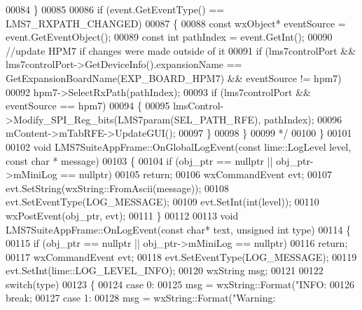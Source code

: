 \begin{DoxyCode}
00084 \textcolor{comment}{    \}}
00085 \textcolor{comment}{}
00086 \textcolor{comment}{    if (event.GetEventType() == LMS7\_RXPATH\_CHANGED)}
00087 \textcolor{comment}{    \{}
00088 \textcolor{comment}{        const wxObject* eventSource = event.GetEventObject();}
00089 \textcolor{comment}{        const int pathIndex = event.GetInt();}
00090 \textcolor{comment}{        //update HPM7 if changes were made outside of it}
00091 \textcolor{comment}{        if (lms7controlPort && lms7controlPort->GetDeviceInfo().expansionName ==
       GetExpansionBoardName(EXP\_BOARD\_HPM7) && eventSource != hpm7)}
00092 \textcolor{comment}{            hpm7->SelectRxPath(pathIndex);}
00093 \textcolor{comment}{        if (lms7controlPort && eventSource == hpm7)}
00094 \textcolor{comment}{        \{}
00095 \textcolor{comment}{            lmsControl->Modify\_SPI\_Reg\_bits(LMS7param(SEL\_PATH\_RFE), pathIndex);}
00096 \textcolor{comment}{            mContent->mTabRFE->UpdateGUI();}
00097 \textcolor{comment}{        \}}
00098 \textcolor{comment}{    \}}
00099 \textcolor{comment}{ */}
00100 \}
00101 
00102 \textcolor{keywordtype}{void} LMS7SuiteAppFrame::OnGlobalLogEvent(\textcolor{keyword}{const} lime::LogLevel level, \textcolor{keyword}{const} \textcolor{keywordtype}{char} *
      message)
00103 \{
00104     \textcolor{keywordflow}{if} (obj\_ptr == \textcolor{keyword}{nullptr} || obj\_ptr->mMiniLog == \textcolor{keyword}{nullptr})
00105         \textcolor{keywordflow}{return};
00106     wxCommandEvent evt;
00107     evt.SetString(wxString::FromAscii(message));
00108     evt.SetEventType(LOG\_MESSAGE);
00109     evt.SetInt(\textcolor{keywordtype}{int}(level));
00110     wxPostEvent(obj\_ptr, evt);
00111 \}
00112 
00113 \textcolor{keywordtype}{void} LMS7SuiteAppFrame::OnLogEvent(\textcolor{keyword}{const} \textcolor{keywordtype}{char}* text, \textcolor{keywordtype}{unsigned} \textcolor{keywordtype}{int} type)
00114 \{
00115     \textcolor{keywordflow}{if} (obj\_ptr == \textcolor{keyword}{nullptr} || obj\_ptr->mMiniLog == \textcolor{keyword}{nullptr})
00116         \textcolor{keywordflow}{return};
00117     wxCommandEvent evt;
00118     evt.SetEventType(LOG\_MESSAGE);
00119     evt.SetInt(lime::LOG_LEVEL_INFO);
00120     wxString msg;
00121 
00122     \textcolor{keywordflow}{switch}(type)
00123     \{
00124     \textcolor{keywordflow}{case} 0:
00125         msg = wxString::Format(\textcolor{stringliteral}{"INFO: %
00126         \textcolor{keywordflow}{break};
00127     \textcolor{keywordflow}{case} 1:
00128         msg = wxString::Format(\textcolor{stringliteral}{"Warning: %
}}
\end{DoxyCode}
